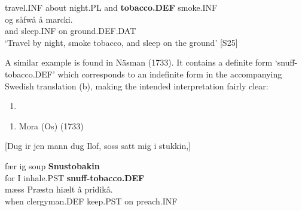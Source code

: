 travel.INF  about  night.PL  and  \textbf{tobacco.DEF} smoke.INF\\ %


\ea\label{}
\gll og  såfwå  å  marcki.\\


and  sleep.INF  on   ground.DEF.DAT\\ %


‘Travel by night, smoke tobacco, and sleep on the ground’ [S25] 
\z

A similar example is found in Näsman (1733). It contains a definite form  ‘snuff-tobacco.DEF’ which corresponds to an indefinite form in the accompanying Swedish translation (b), making the intended interpretation fairly clear:

\begin{enumerate} %
\item 
\end{enumerate} %
\setcounter{listLFOxcviiileveli}{0}
\begin{enumerate} %
\item 
Mora (Os) (1733)

\end{enumerate} %
[Dug ir jen mann dug Ilof, soss satt mig i stukkin,]


\ea\label{}
\gll fær  ig  soup  \textbf{Snustobakin}\\


for  I  inhale.PST  \textbf{snuff-tobacco.DEF}\\ %


\ea\label{}
\gll mæss  Præstn  hiælt  â  pridikâ.\\


when  clergyman.DEF  keep.PST  on   preach.INF\\ %



